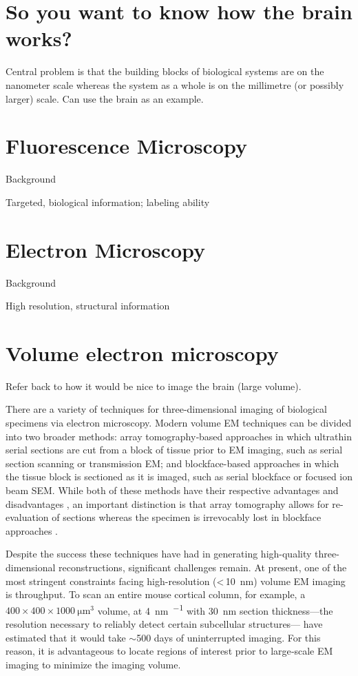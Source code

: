 
\section{So you want to know how the brain works?}

Central problem is that the building blocks of biological systems are on the nanometer scale whereas the system as a whole is on the millimetre (or possibly larger) scale. Can use the brain as an example.

\section{Fluorescence Microscopy}

Background

Targeted, biological information; labeling ability


\section{Electron Microscopy}

Background

High resolution, structural information


\section{Volume electron microscopy}

Refer back to how it would be nice to image the brain (large volume).

There are a variety of techniques for three‐dimensional imaging of biological specimens via electron microscopy. Modern volume EM techniques can be divided into two broader methods: array tomography‐based approaches in which ultrathin serial sections are cut from a block of tissue prior to EM imaging, such as serial section scanning or transmission EM; and blockface-based approaches in which the tissue block is sectioned as it is imaged, such as serial blockface or focused ion beam SEM. While both of these methods have their respective advantages and disadvantages \cite{briggman2012volume, peddie2014exploring, collinson2017correlating}, an important distinction is that array tomography allows for re-evaluation of sections whereas the specimen is irrevocably lost in blockface approaches \cite{schifferer2021niwaki}.

Despite the success these techniques have had in generating high-quality three-dimensional reconstructions, significant challenges remain. At present, one of the most stringent constraints facing high-resolution (<\,\SI{10}{\nano\meter}) volume EM imaging is throughput. To scan an entire mouse cortical column, for example, a $400 \times 400 \times \SI{1000}{\micro\meter^3}$ volume, at \SI{4}{\nano\meter\per\pixel} with \SI{30}{\nano\meter} section thickness---the resolution necessary to reliably detect certain subcellular structures---\textcite{briggman2012volume} have estimated that it would take $\sim$500 days of uninterrupted imaging. For this reason, it is advantageous to locate regions of interest prior to large‐scale EM imaging to minimize the imaging volume.

